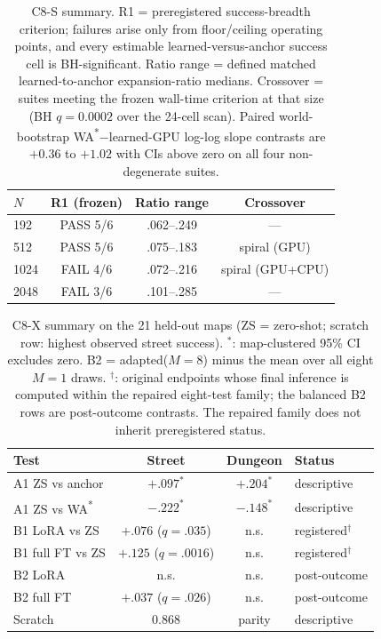 \documentclass[letterpaper]{article} %
\newcommand{\stage}[1]{\textsc{#1}}
\begin{document}
\begin{table}[t]
\centering
\small
\setlength{\tabcolsep}{2.6pt}
\begin{tabular}{@{}lccc@{}}
\toprule
$N$ & R1 (frozen) & Ratio range & Crossover \\
\midrule
192 & PASS 5/6 & .062--.249 & --- \\
512 & PASS 5/6 & .075--.183 & spiral (GPU) \\
1024 & FAIL 4/6 & .072--.216 & spiral (GPU+CPU) \\
2048 & FAIL 3/6 & .101--.285 & --- \\
\bottomrule
\end{tabular}
\caption{\stage{C8-S} summary. R1 = preregistered success-breadth criterion; failures arise only from floor/ceiling operating points, and every estimable learned-versus-anchor success cell is BH-significant. Ratio range = defined matched learned-to-anchor expansion-ratio medians. Crossover = suites meeting the frozen wall-time criterion at that size (BH $q{=}0.0002$ over the 24-cell scan). Paired world-bootstrap WA\textsuperscript{*}$-$learned-GPU log-log slope contrasts are $+0.36$ to $+1.02$ with CIs above zero on all four non-degenerate suites.}
\label{tab:c8s-summary}
\end{table}

\begin{table}[b]
\centering
\footnotesize
\setlength{\tabcolsep}{1.4pt}
\begin{tabular}{@{}lccl@{}}
\toprule
Test & Street & Dungeon & Status \\
\midrule
A1 ZS vs anchor & $+.097^{*}$ & $+.204^{*}$ & descriptive \\
A1 ZS vs WA\textsuperscript{*} & $-.222^{*}$ & $-.148^{*}$ & descriptive \\
B1 LoRA vs ZS & $+.076$ ($q{=}.035$) & n.s. & registered$^{\dagger}$ \\
B1 full FT vs ZS & $+.125$ ($q{=}.0016$) & n.s. & registered$^{\dagger}$ \\
B2 LoRA & n.s. & n.s. & post-outcome \\
B2 full FT & $+.037$ ($q{=}.026$) & n.s. & post-outcome \\
Scratch & 0.868 & parity & descriptive \\
\bottomrule
\end{tabular}
\caption{\stage{C8-X} summary on the 21 held-out maps (ZS = zero-shot; scratch row: highest observed street success). $^{*}$: map-clustered 95\% CI excludes zero. B2 = adapted($M{=}8$) minus the mean over all eight $M{=}1$ draws. $^{\dagger}$: original endpoints whose final inference is computed within the repaired eight-test family; the balanced B2 rows are post-outcome contrasts. The repaired family does not inherit preregistered status.}
\label{tab:c8x-summary}
\end{table}
\end{document}
